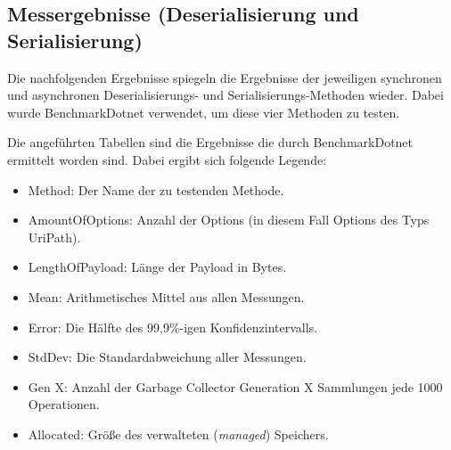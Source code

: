 \subsection{Messergebnisse (Deserialisierung und Serialisierung)}
\label{subsec:messergebnisse-deserialisierung-serialisierung}

Die nachfolgenden Ergebnisse spiegeln die Ergebnisse der jeweiligen synchronen und asynchronen Deserialisierungs- und Serialisierungs-Methoden wieder. Dabei wurde BenchmarkDotnet verwendet, um diese vier Methoden zu testen.

Die angeführten Tabellen sind die Ergebnisse die durch BenchmarkDotnet ermittelt worden sind. Dabei ergibt sich folgende Legende:
\begin{itemize}
    \item Method: Der Name der zu testenden Methode.
    \item AmountOfOptions: Anzahl der Options (in diesem Fall Options des Typs UriPath).
    \item LengthOfPayload: Länge der Payload in Bytes.
    \item Mean: Arithmetisches Mittel aus allen Messungen.
    \item Error: Die Hälfte des 99,9\%-igen Konfidenzintervalls.
    \item StdDev: Die Standardabweichung aller Messungen.
    \item Gen X: Anzahl der Garbage Collector Generation X Sammlungen jede 1000 Operationen.
    \item Allocated: Größe des verwalteten (\textit{managed}) Speichers.
\end{itemize}

\begin{table}[h]
    \caption{Benchmark mit 0 Options und mit einer Payload von 0 Bytes}
    \label{tab:benchmark-0-0}
\end{table}


